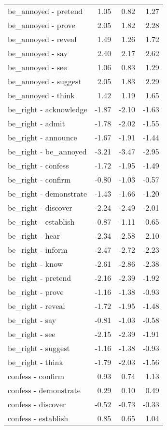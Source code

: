 \begin{longtable}{lrrr}
  be_annoyed - pretend & 1.05 & 0.82 & 1.27 \\ 
  be_annoyed - prove & 2.05 & 1.82 & 2.28 \\ 
  be_annoyed - reveal & 1.49 & 1.26 & 1.72 \\ 
  be_annoyed - say & 2.40 & 2.17 & 2.62 \\ 
  be_annoyed - see & 1.06 & 0.83 & 1.29 \\ 
  be_annoyed - suggest & 2.05 & 1.83 & 2.29 \\ 
  be_annoyed - think & 1.42 & 1.19 & 1.65 \\ 
  be_right - acknowledge & -1.87 & -2.10 & -1.63 \\ 
  be_right - admit & -1.78 & -2.02 & -1.55 \\ 
  be_right - announce & -1.67 & -1.91 & -1.44 \\ 
  be_right - be_annoyed & -3.21 & -3.47 & -2.95 \\ 
  be_right - confess & -1.72 & -1.95 & -1.49 \\ 
  be_right - confirm & -0.80 & -1.03 & -0.57 \\ 
  be_right - demonstrate & -1.43 & -1.66 & -1.20 \\ 
  be_right - discover & -2.24 & -2.49 & -2.01 \\ 
  be_right - establish & -0.87 & -1.11 & -0.65 \\ 
  be_right - hear & -2.34 & -2.58 & -2.10 \\ 
  be_right - inform & -2.47 & -2.72 & -2.23 \\ 
  be_right - know & -2.61 & -2.86 & -2.38 \\ 
  be_right - pretend & -2.16 & -2.39 & -1.92 \\ 
  be_right - prove & -1.16 & -1.38 & -0.93 \\ 
  be_right - reveal & -1.72 & -1.95 & -1.48 \\ 
  be_right - say & -0.81 & -1.03 & -0.58 \\ 
  be_right - see & -2.15 & -2.39 & -1.91 \\ 
  be_right - suggest & -1.16 & -1.38 & -0.93 \\ 
  be_right - think & -1.79 & -2.03 & -1.56 \\ 
  confess - confirm & 0.93 & 0.74 & 1.13 \\ 
  confess - demonstrate & 0.29 & 0.10 & 0.49 \\ 
  confess - discover & -0.52 & -0.73 & -0.33 \\ 
  confess - establish & 0.85 & 0.65 & 1.04 \\ 

\end{longtable}
